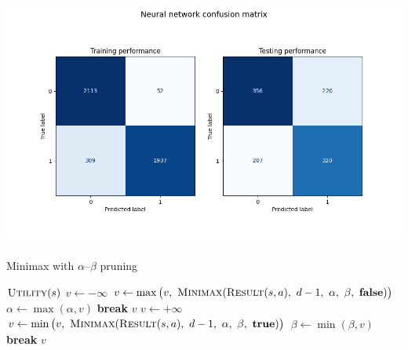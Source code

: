 \documentclass[12pt]{article}
\begin{document}
\begin{center} \includegraphics[width=6in]{"../output/nn_training_testing_confusion_matrices.png"} \end{center}

\begin{algorithm}[H]
\caption{Minimax with $\alpha$–$\beta$ pruning}
\label{alg:alphabeta}
\begin{algorithmic}[1]
        \State \Return $\textsc{Utility}(s)$
    \EndIf
        \State $v \gets -\infty$
            \State $v \gets \max\big(v,\ \textsc{Minimax}(\textsc{Result}(s,a),\ d-1,\ \alpha,\ \beta,\ \textbf{false})\big)$
            \State $\alpha \gets \max(\alpha, v)$
            \If{$\alpha \ge \beta$} \State \textbf{break}
            \EndIf
        \EndFor
        \State \Return $v$
    \Else
        \State $v \gets +\infty$
            \State $v \gets \min\big(v,\ \textsc{Minimax}(\textsc{Result}(s,a),\ d-1,\ \alpha,\ \beta,\ \textbf{true})\big)$
            \State $\beta \gets \min(\beta, v)$
            \If{$\alpha \ge \beta$} \State \textbf{break}
            \EndIf
        \EndFor
        \State \Return $v$
    \EndIf
\EndFunction
\end{algorithmic}
\end{algorithm}
\end{document}
